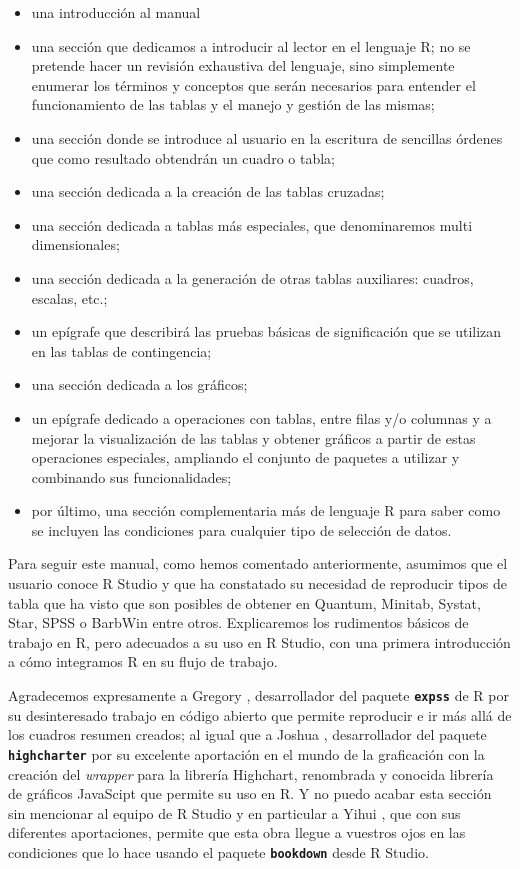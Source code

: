\documentclass[
]{book}
\providecommand{\tightlist}{%
  \setlength{\itemsep}{0pt}\setlength{\parskip}{0pt}}
\begin{document}
\begin{itemize}
\tightlist
\item
  una introducción al manual
\item
  una sección que dedicamos a introducir al lector en el lenguaje R; no se pretende hacer un revisión exhaustiva del lenguaje, sino simplemente enumerar los términos y conceptos que serán necesarios para entender el funcionamiento de las tablas y el manejo y gestión de las mismas;
\item
  una sección donde se introduce al usuario en la escritura de sencillas órdenes que como resultado obtendrán un cuadro o tabla;
\item
  una sección dedicada a la creación de las tablas cruzadas;
\item
  una sección dedicada a tablas más especiales, que denominaremos multi dimensionales;
\item
  una sección dedicada a la generación de otras tablas auxiliares: cuadros, escalas, etc.;
\item
  un epígrafe que describirá las pruebas básicas de significación que se utilizan en las tablas de contingencia;
\item
  una sección dedicada a los gráficos;
\item
  un epígrafe dedicado a operaciones con tablas, entre filas y/o columnas y a mejorar la visualización de las tablas y obtener gráficos a partir de estas operaciones especiales, ampliando el conjunto de paquetes a utilizar y combinando sus funcionalidades;
\item
  por último, una sección complementaria más de lenguaje R para saber como se incluyen las condiciones para cualquier tipo de selección de datos.
\end{itemize}

Para seguir este manual, como hemos comentado anteriormente, asumimos que el usuario conoce R Studio y que ha constatado su necesidad de reproducir tipos de tabla que ha visto que son posibles de obtener en Quantum, Minitab, Systat, Star, SPSS o BarbWin entre otros. Explicaremos los rudimentos básicos de trabajo en R, pero adecuados a su uso en R Studio, con una primera introducción a cómo integramos R en su flujo de trabajo.

Agradecemos expresamente a Gregory \citet{expss}, desarrollador del paquete \textbf{\texttt{expss}} de R por su desinteresado trabajo en código abierto que permite reproducir e ir más allá de los cuadros resumen creados; al igual que a Joshua \citet{highcharter}, desarrollador del paquete \textbf{\texttt{highcharter}} por su excelente aportación en el mundo de la graficación con la creación del \emph{wrapper} para la librería Highchart, renombrada y conocida librería de gráficos JavaScipt que permite su uso en R. Y no puedo acabar esta sección sin mencionar al equipo de R Studio y en particular a Yihui \citet{bookdown}, que con sus diferentes aportaciones, permite que esta obra llegue a vuestros ojos en las condiciones que lo hace usando el paquete \textbf{\texttt{bookdown}} desde R Studio.
\end{document}

